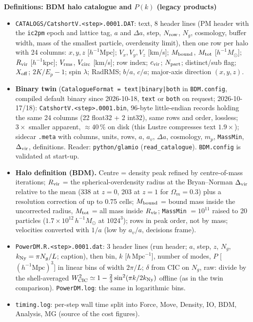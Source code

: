 \documentclass[UTF8]{beamer}
\begin{document}
\begin{frame}{\textbf{Definitions: BDM halo catalogue and $P(k)$ (legacy products)}}
  \scriptsize
  \begin{itemize}
    \item \texttt{CATALOGS/CatshortV.<step>.0001.DAT}: text, 8 header lines (PM header with the \texttt{ic2pm} epoch and
      lattice tag, $a$ and $\Delta a$, step, $N_{\rm row}$, $N_g$, cosmology, buffer width, mass of the smallest particle,
      overdensity limit), then one row per halo with 24 columns:
      $x, y, z$ [$h^{-1}$Mpc]; $V_x, V_y, V_z$ [km/s]; $M_{\rm bound}$, $M_{\rm tot}$ [$h^{-1}M_\odot$]; $R_{\rm vir}$
      [$h^{-1}$kpc]; $V_{\rm rms}$, $V_{\rm circ}$ [km/s]; row index; $c_{\rm vir}$; $N_{\rm part}$; distinct/sub flag;
      $X_{\rm off}$; $2K/E_p - 1$; spin $\lambda$; RadRMS; $b/a$, $c/a$; major-axis direction $(x, y, z)$.
    \item \textbf{Binary twin} (\texttt{CatalogueFormat = text|binary|both} in \texttt{BDM.config}, compiled default binary
      since 2026-10-18, \texttt{text} or \texttt{both} on request; 2026-10-17/18): \texttt{CatshortV.<step>.0001.bin}, 96-byte little-endian records
      holding the same 24 columns (22 float32 + 2 int32), same rows and order, lossless; $3\times$ smaller apparent,
      $\approx 40\,\%$ on disk (this Lustre compresses text $1.9\times$); sidecar \texttt{.meta} with columns, units,
      rows, $a$, $a_v$, $\Delta a$, cosmology, $m_p$, \texttt{MassMin}, $\Delta_{\rm vir}$, definitions. Reader:
      \texttt{python/glamio} (\texttt{read\_catalogue}). \texttt{BDM.config} is validated at start-up.
    \item \textbf{Halo definition (BDM).} Centre = density peak refined by centre-of-mass iterations; $R_{\rm vir}$ = the
      spherical-overdensity radius at the Bryan--Norman $\Delta_{\rm vir}$ relative to the mean ($338$ at $z = 0$, 203 at
      $z = 1$ for $\Omega_m = 0.3$) plus a resolution correction of up to 0.75 cells; $M_{\rm bound}$ = bound mass inside the
      uncorrected radius, $M_{\rm tot}$ = all mass inside $R_{\rm vir}$; \texttt{MassMin} $= 10^{11}$ raised to 20 particles
      ($1.7\times10^{12}\,h^{-1}M_\odot$ at $1024^3$); rows in peak order, not by mass; velocities converted with $1/a$
      (low by $a_v/a$, decisions frame).
    \item \texttt{PowerDM.R.<step>.0001.dat}: 3 header lines (run header; $a$, step, $z$, $N_g$, $k_{\rm Ny} = \pi N_g/L$; caption), then
      bin, $k$ [$h\,\mathrm{Mpc}^{-1}$], number of modes, $P$ [$(h^{-1}\mathrm{Mpc})^3$] in linear bins of width $2\pi/L$;
      $\delta$ from CIC on $N_g$, raw: divide by the shell-averaged $W_{\rm CIC}^2 \simeq 1 - \tfrac{2}{3}\sin^2(\pi k/2k_{\rm Ny})$
      offline (as in the twin comparison). \texttt{PowerDM.log}: the same in logarithmic bins.
    \item \texttt{timing.log}: per-step wall time split into Force, Move, Density, IO, BDM, Analysis, MG (source of the cost figures).
  \end{itemize}
\end{frame}
\end{document}
